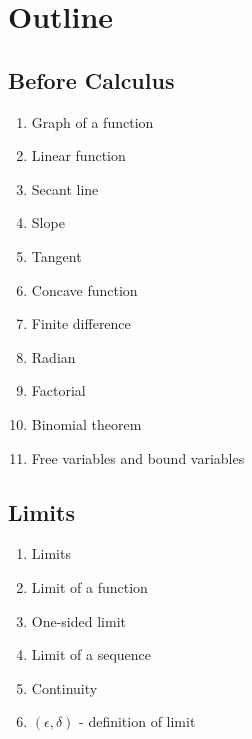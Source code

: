 \chapter{Outline}

\section{Before Calculus}
\begin{enumerate}
\item Graph of a function
\item Linear function
\item Secant line
\item Slope
\item Tangent
\item Concave function
\item Finite difference
\item Radian
\item Factorial
\item Binomial theorem
\item Free variables and bound variables
\end{enumerate}

\section{Limits}
\begin{enumerate}
\item Limits
\item Limit of a function
\item One-sided limit
\item Limit of a sequence
\item Continuity
\item $(\epsilon,\delta)$ - definition of limit
\end{enumerate}

